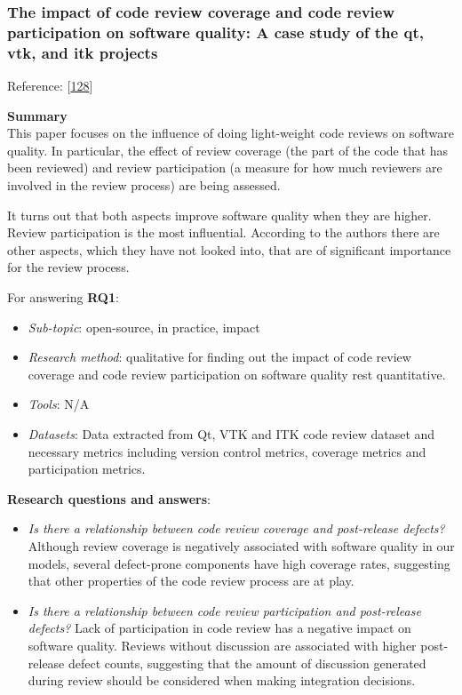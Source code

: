 \documentclass[]{book}
\providecommand{\tightlist}{%
  \setlength{\itemsep}{0pt}\setlength{\parskip}{0pt}}
\begin{document}
\subsubsection{The impact of code review coverage and code review
participation on software quality: A case study of the qt, vtk, and itk
projects}\label{the-impact-of-code-review-coverage-and-code-review-participation-on-software-quality-a-case-study-of-the-qt-vtk-and-itk-projects}

Reference: {[}\protect\hyperlink{ref-mcintosh2014impact}{128}{]}

\textbf{Summary}\\
This paper focuses on the influence of doing light-weight code reviews
on software quality. In particular, the effect of review coverage (the
part of the code that has been reviewed) and review participation (a
measure for how much reviewers are involved in the review process) are
being assessed.

It turns out that both aspects improve software quality when they are
higher. Review participation is the most influential. According to the
authors there are other aspects, which they have not looked into, that
are of significant importance for the review process.

For answering \textbf{RQ1}:

\begin{itemize}
\tightlist
\item
  \emph{Sub-topic}: open-source, in practice, impact
\item
  \emph{Research method}: qualitative for finding out the impact of code
  review coverage and code review participation on software quality rest
  quantitative.
\item
  \emph{Tools}: N/A
\item
  \emph{Datasets}: Data extracted from Qt, VTK and ITK code review
  dataset and necessary metrics including version control metrics,
  coverage metrics and participation metrics.
\end{itemize}

\textbf{Research questions and answers}:

\begin{itemize}
\item
  \emph{Is there a relationship between code review coverage and
  post-release defects?} Although review coverage is negatively
  associated with software quality in our models, several defect-prone
  components have high coverage rates, suggesting that other properties
  of the code review process are at play.
\item
  \emph{Is there a relationship between code review participation and
  post-release defects?} Lack of participation in code review has a
  negative impact on software quality. Reviews without discussion are
  associated with higher post-release defect counts, suggesting that the
  amount of discussion generated during review should be considered when
  making integration decisions.
\end{itemize}
\end{document}
